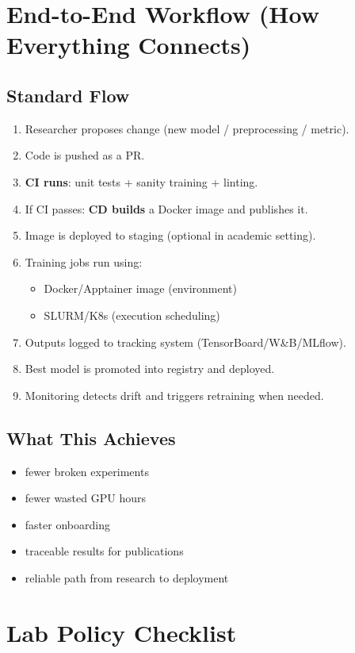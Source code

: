 \documentclass[11pt]{article}
\begin{document}
\section{End-to-End Workflow (How Everything Connects)}

\subsection{Standard Flow}
\begin{enumerate}
  \item Researcher proposes change (new model / preprocessing / metric).
  \item Code is pushed as a PR.
  \item \textbf{CI runs}: unit tests + sanity training + linting.
  \item If CI passes: \textbf{CD builds} a Docker image and publishes it.
  \item Image is deployed to staging (optional in academic setting).
  \item Training jobs run using:
    \begin{itemize}
      \item Docker/Apptainer image (environment)
      \item SLURM/K8s (execution scheduling)
    \end{itemize}
  \item Outputs logged to tracking system (TensorBoard/W\&B/MLflow).
  \item Best model is promoted into registry and deployed.
  \item Monitoring detects drift and triggers retraining when needed.
\end{enumerate}

\subsection{What This Achieves}
\begin{itemize}
  \item fewer broken experiments
  \item fewer wasted GPU hours
  \item faster onboarding
  \item traceable results for publications
  \item reliable path from research to deployment
\end{itemize}

\section{Lab Policy Checklist}
\end{document}
